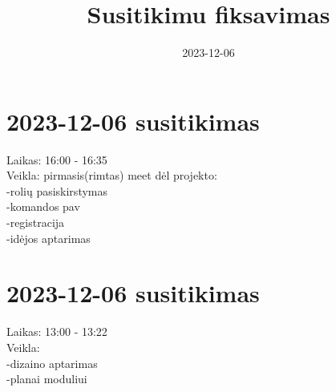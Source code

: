 \documentclass{article}
\title{Susitikimu fiksavimas}
\date{2023-12-06}
\begin{document}
\maketitle

\tableofcontents


    \section*{2023-12-06 susitikimas}
    Laikas: 16:00 - 16:35\\
    Veikla: pirmasis(rimtas) meet dėl projekto:\\
    -rolių pasiskirstymas\\
    -komandos pav\\
    -registracija\\
    -idėjos aptarimas\\
    \section*{2023-12-06 susitikimas}
    Laikas: 13:00 - 13:22\\
    Veikla: \\
    -dizaino aptarimas \\
    -planai moduliui \\
\end{document}

